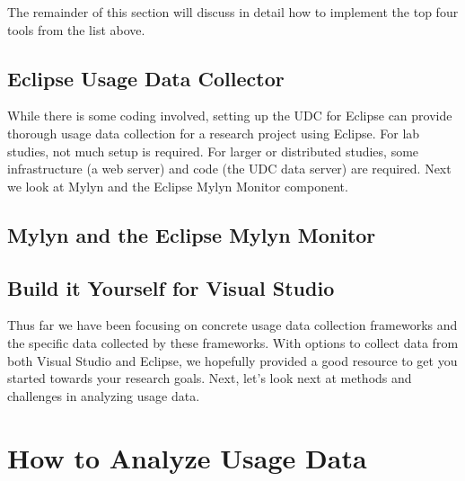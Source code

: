 
The remainder of this section will discuss in detail how to implement the top four tools from the list above.

\subsection{Eclipse Usage Data Collector}
\label{EclipseUsageDataCollector}


\vspace{0.1in}
While there is some coding involved, setting up the UDC for Eclipse can provide thorough usage data collection for a research project using Eclipse.   For lab studies, not much setup is required.  For larger or distributed studies, some infrastructure (a web server) and code (the UDC data server) are required.  Next we look at Mylyn and the Eclipse Mylyn Monitor component.

\subsection{Mylyn and the Eclipse Mylyn Monitor}
\label{MylynMonitor}






\subsection{Build it Yourself for Visual Studio}
\label{buildItYourself}


\vspace{0.1in}
Thus far we have been focusing on concrete usage data collection frameworks and the specific data collected by these frameworks.  With options to collect data from both Visual Studio and Eclipse, we hopefully provided a good resource to get you started towards your research goals.  Next, let's look next at methods and challenges in analyzing usage data.

\newpage

\section{How to Analyze Usage Data}

